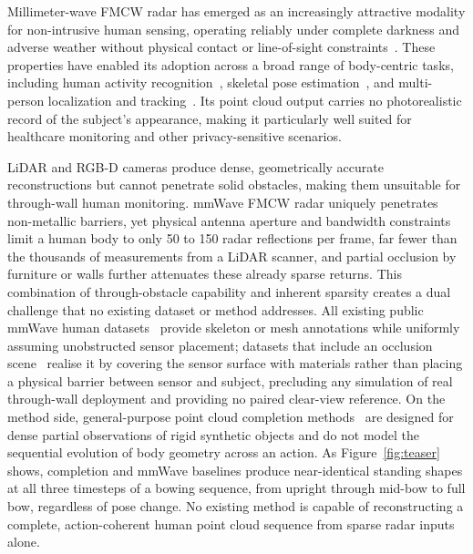 \documentclass{article}
\begin{document}
Millimeter-wave FMCW radar has emerged as an increasingly attractive modality
for non-intrusive human sensing, operating reliably under complete darkness and
adverse weather without physical contact or line-of-sight
constraints~\cite{yang2023mmfi,mmwavesurvey}.
These properties have enabled its adoption across a broad range of body-centric
tasks, including human activity recognition~\cite{yang2023mmfi,radhar,har_sensors2025},
skeletal pose estimation~\cite{mmhpe,radarskelet,virteach,points},
and multi-person localization and tracking~\cite{m3pose}.
Its point cloud output carries no photorealistic record of the subject's
appearance, making it particularly well suited for healthcare monitoring and
other privacy-sensitive scenarios.

LiDAR and RGB-D cameras produce dense, geometrically accurate reconstructions
but cannot penetrate solid obstacles, making them unsuitable for through-wall
human monitoring.
mmWave FMCW radar uniquely penetrates non-metallic barriers, yet physical antenna
aperture and bandwidth constraints limit a human body to only 50 to 150 radar
reflections per frame, far fewer than the thousands of measurements from a LiDAR
scanner, and partial occlusion by furniture or walls further attenuates these
already sparse returns.
This combination of through-obstacle capability and inherent sparsity creates a
dual challenge that no existing dataset or method addresses.
All existing public mmWave human datasets~\cite{yang2023mmfi,mri,m4human}
provide skeleton or mesh annotations while uniformly assuming unobstructed
sensor placement; datasets that include an occlusion
scene~\cite{mmbody,rfpose} realise it by covering the sensor surface with
materials rather than placing a physical barrier between sensor and subject,
precluding any simulation of real through-wall deployment and providing no
paired clear-view reference.
On the method side, general-purpose point cloud completion
methods~\cite{pcn,pointr,snowflake} are designed for dense partial
observations of rigid synthetic objects and do not model the sequential
evolution of body geometry across an action.
As Figure~\ref{fig:teaser} shows, completion and mmWave baselines produce
near-identical standing shapes at all three timesteps of a bowing sequence,
from upright through mid-bow to full bow, regardless of pose change.
No existing method is capable of reconstructing a complete, action-coherent
human point cloud sequence from sparse radar inputs alone.
\end{document}
